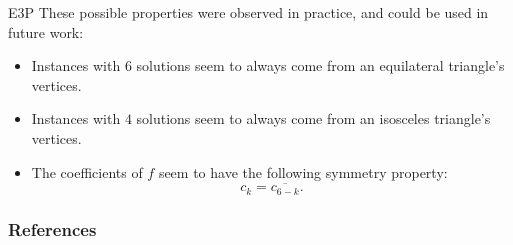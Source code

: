 \documentclass{beamer}
\theoremstyle{definition}
\begin{document}
\begin{frame}{E3P}
	These possible properties were observed in practice, and could be used in future work:
	\begin{itemize}
		\item Instances with $6$ solutions seem to always come from an equilateral triangle's vertices.
		\item Instances with $4$ solutions seem to always come from an isosceles triangle's vertices.
		\item The coefficients of $f$ seem to have the following symmetry property:
		\begin{equation*}
		c_k = \overline{c_{6-k}}.
		\end{equation*}
	\end{itemize}
\end{frame}

\begin{frame}[allowframebreaks]
	\frametitle{References}
	
	
\end{frame}
	
\end{document}
